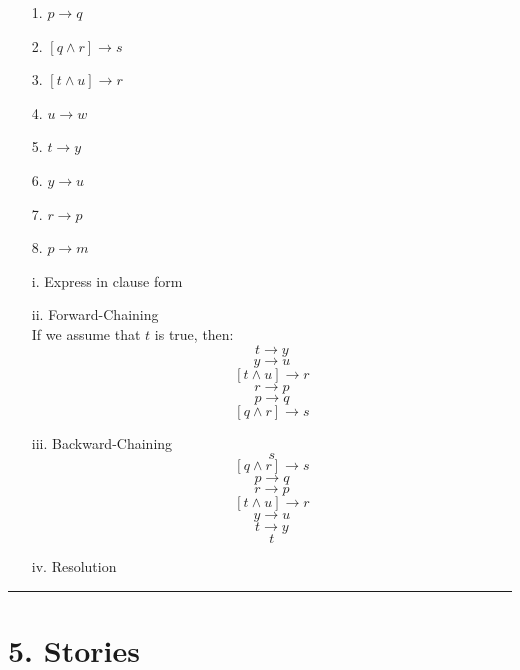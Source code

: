 \documentclass[11pt]{article}
\begin{document}
\begin{flushleft}
\begin{enumerate}
        \begin{center}
            \begin{minipage}{0.4\textwidth}
                \begin{enumerate}
                    \item[1.] $p \rightarrow q$
                    \item[2.] $[q \land r] \rightarrow s$
                    \item[3.] $[t \land u] \rightarrow r$
                    \item[4.] $u \rightarrow w$
                    \item[5.] $t \rightarrow y$
                    \item[6.] $y \rightarrow u$
                    \item[7.] $r \rightarrow p$
                    \item[8.] $p \rightarrow m$
                \end{enumerate}
            \end{minipage}
        \end{center}

        \begin{enumerate}
            \item[i.] Express in clause form
            \item[ii.] Forward-Chaining\\
                If we assume that $t$ is true, then:
                $$ t \rightarrow y $$
                $$ y \rightarrow u $$
                $$ [t \land u] \rightarrow r $$
                $$ r \rightarrow p $$
                $$ p \rightarrow q $$
                $$ [q \land r] \rightarrow s $$

            \item[iii.] Backward-Chaining
                $$ s $$
                $$ [q \land r] \rightarrow s $$
                $$ p \rightarrow q $$
                $$ r \rightarrow p $$
                $$ [t \land u] \rightarrow r $$
                $$ y \rightarrow u $$
                $$ t \rightarrow y $$
                $$ t $$

            \item[iv.] Resolution
        \end{enumerate}

\end{enumerate}

\rule[0.1pt]{40em}{1.0pt}

\section*{5. Stories}
\begin{enumerate}


\end{enumerate}
\end{flushleft}
\end{document}
